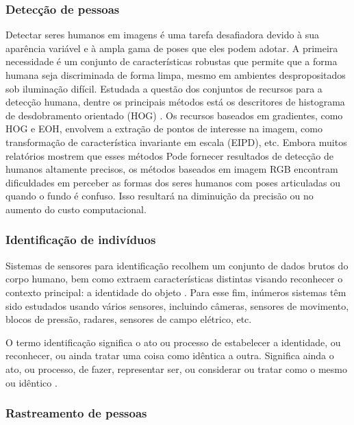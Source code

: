 \subsubsection{Detecção de pessoas}\label{sec:deteccao-movimento}
Detectar seres humanos em imagens é uma tarefa desafiadora devido à sua aparência variável e à ampla gama de poses que eles podem adotar. A primeira necessidade é um conjunto de características robustas que permite que a forma humana seja discriminada de forma limpa, mesmo em ambientes despropositados sob iluminação difícil. Estudada a questão dos conjuntos de recursos para a detecção humana, dentre os principais métodos está  os descritores de histograma de desdobramento orientado (HOG) \cite{dalal2005histograms}. Os recursos baseados em gradientes, como HOG e EOH, envolvem a extração de pontos de interesse na imagem, como transformação de característica invariante em escala (EIPD), etc. Embora muitos relatórios mostrem que esses métodos Pode fornecer resultados de detecção de humanos altamente precisos, os métodos baseados em imagem RGB encontram dificuldades em perceber as formas dos seres humanos com poses articuladas ou quando o fundo é confuso. Isso resultará na diminuição da precisão ou no aumento do custo computacional\cite{dalal2005histograms}.

\subsubsection{Identificação de indivíduos}\label{sec:identificacao-pessoas}

Sistemas de sensores para identificação recolhem um conjunto de dados brutos do corpo humano, bem como extraem características distintas visando reconhecer o contexto principal: a identidade do objeto \cite{yun2014human}. Para esse fim, inúmeros sistemas têm sido estudados usando vários sensores, incluindo câmeras, sensores de movimento, blocos de pressão, radares, sensores de campo elétrico, etc.

O termo identificação significa o ato ou processo de estabelecer a identidade, ou reconhecer, ou ainda tratar uma coisa como idêntica a outra. Significa ainda o ato, ou processo, de fazer, representar ser, ou considerar ou tratar como o mesmo ou idêntico\cite{yun2014human} .

\subsubsection{Rastreamento de pessoas}\label{sec:rastre-amb-fec}

